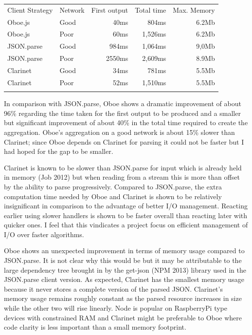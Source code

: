 \documentclass[12pt, ]{article}
\begin{document}
\begin{longtable}[c]{@{}llrrr@{}}
\hline\noalign{\medskip}
Client Strategy & Network & First output & Total time & Max. Memory
\\\noalign{\medskip}
\hline\noalign{\medskip}
Oboe.js & Good & 40ms & 804ms & 6.2Mb
\\\noalign{\medskip}
Oboe.js & Poor & 60ms & 1,526ms & 6.2Mb
\\\noalign{\medskip}
JSON.parse & Good & 984ms & 1,064ms & 9,0Mb
\\\noalign{\medskip}
JSON.parse & Poor & 2550ms & 2,609ms & 8.9Mb
\\\noalign{\medskip}
Clarinet & Good & 34ms & 781ms & 5.5Mb
\\\noalign{\medskip}
Clarinet & Poor & 52ms & 1,510ms & 5.5Mb
\\\noalign{\medskip}
\hline
\end{longtable}

In comparison with JSON.parse, Oboe shows a dramatic improvement of
about 96\% regarding the time taken for the first output to be produced
and a smaller but significant improvement of about 40\% in the total
time required to create the aggregation. Oboe's aggregation on a good
network is about 15\% slower than Clarinet; since Oboe depends on
Clarinet for parsing it could not be faster but I had hoped for the gap
to be smaller.

Clarinet is known to be slower than JSON.parse for input which is
already held in memory (Job 2012) but when reading from a stream this is
more than offset by the ability to parse progressively. Compared to
JSON.parse, the extra computation time needed by Oboe and Clarinet is
shown to be relatively insignificant in comparison to the advantage of
better I/O management. Reacting earlier using slower handlers is shown
to be faster overall than reacting later with quicker ones. I feel that
this vindicates a project focus on efficient management of I/O over
faster algorithms.

Oboe shows an unexpected improvement in terms of memory usage compared
to JSON.parse. It is not clear why this would be but it may be
attributable to the large dependency tree brought in by the get-json
(NPM 2013) library used in the JSON.parse client version. As expected,
Clarinet has the smallest memory usage because it never stores a
complete version of the parsed JSON. Clarinet's memory usage remains
roughly constant as the parsed resource increases in size while the
other two will rise linearly. Node is popular on RaspberryPi type
devices with constrained RAM and Clarinet might be preferable to Oboe
where code clarity is less important than a small memory footprint.
\end{document}
